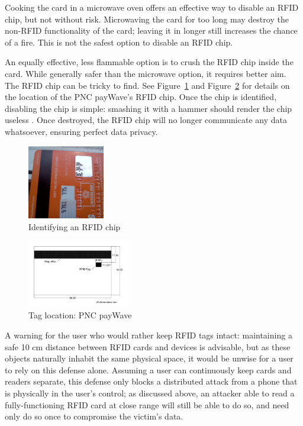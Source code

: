 \documentclass{IEEEtran}
\begin{document}
Cooking the card in a microwave oven offers an effective way to disable an RFID chip, but not without risk.  Microwaving the card for too long may destroy the non-RFID functionality of the card; leaving it in longer still increases the chance of a fire.  This is not the safest option to disable an RFID chip.

An equally effective, less flammable option is to crush the RFID chip inside the card.  While generally safer than the microwave option, it requires better aim.  The RFID chip can be tricky to find.  See Figure~\ref{fig:RFID_in_PNC_Card} and Figure~\ref{fig:RFID_chip_location} for details on the location of the PNC payWave's RFID chip.  Once the chip is identified, disabling the chip is simple: smashing it with a hammer should render the chip useless \cite{threat-analysis-of-rfid-passports}.  Once destroyed, the RFID chip will no longer communicate any data whatsoever, ensuring perfect data privacy.

	\begin{figure}%
	  \centering
	  \includegraphics[width=0.3\textwidth]{images/RFID_in_PNC_Card.png}
	  \caption{Identifying an RFID chip}
	  \label{fig:RFID_in_PNC_Card}
	\end{figure}

	\begin{figure}%
	  \centering
	  \includegraphics[width=0.4\textwidth]{images/RFID_chip_location.png}
	  \caption{Tag location: PNC payWave}
	  \label{fig:RFID_chip_location}
	\end{figure}

A warning for the user who would rather keep RFID tags intact: maintaining a safe 10 cm distance between RFID cards and devices is advisable, but as these objects naturally inhabit the same physical space, it would be unwise for a user to rely on this defense alone.  Assuming a user can continuously keep cards and readers separate, this defense only blocks a distributed attack from a phone that is physically in the user's control; as discussed above, an attacker able to read a fully-functioning RFID card at close range will still be able to do so, and need only do so once to compromise the victim's data.
\end{document}
